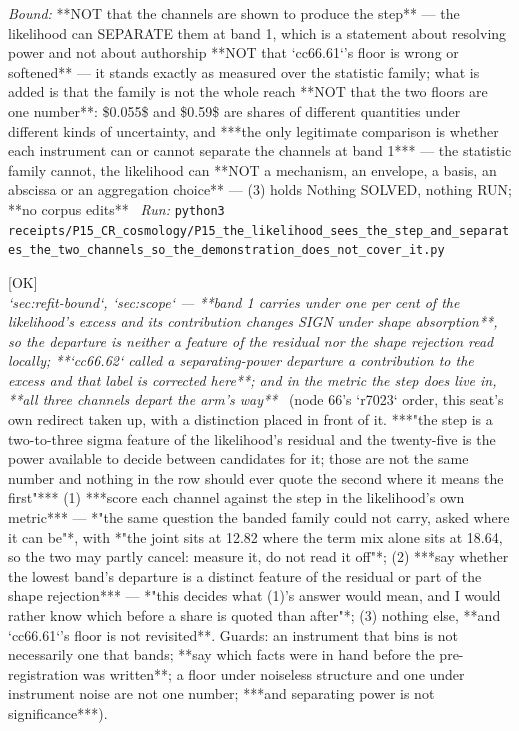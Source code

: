 \begin{description}
 \emph{Bound:}  **NOT that the channels are shown to produce the step** --- the likelihood can SEPARATE them at band 1, which is a statement about resolving power and not about authorship  **NOT that `cc66.61`'s floor is wrong or softened** --- it stands exactly as measured over the statistic family; what is added is that the family is not the whole reach  **NOT that the two floors are one number**: \$0.055\$ and \$0.59\$ are shares of different quantities under different kinds of uncertainty, and ***the only legitimate comparison is whether each instrument can or cannot separate the channels at band 1*** --- the statistic family cannot, the likelihood can  **NOT a mechanism, an envelope, a basis, an abscissa or an aggregation choice** --- (3) holds  Nothing SOLVED, nothing RUN; **no corpus edits**
\ \emph{Run:} \texttt{python3 receipts/P15\_CR\_cosmology/P15\_the\_likelihood\_sees\_the\_step\_and\_separates\_the\_two\_channels\_so\_the\_demonstration\_does\_not\_cover\_it.py}
\item[\rcptlabel{P15_the_band_one_departure_is_not_in_the_likelihoods_excess_and_all_three_channels_match_it_in_separating_power}{P15R210}\textbf{P15R210}\quad\texttt{P15\_the\_band\_one\_departure\_is\_not\_in\_the\_likelihoods\_excess\_and\_all\_three\_channels\_match\_it\_in\_separating\_power}]\hfill\textsf{[OK]}\\
\textit{`sec:refit-bound`, `sec:scope` --- **band 1 carries under one per cent of the likelihood's excess and its contribution changes SIGN under shape absorption**, so the departure is neither a feature of the residual nor the shape rejection read locally; **`cc66.62` called a separating-power departure a contribution to the excess and that label is corrected here**; and in the metric the step does live in, **all three channels depart the arm's way**} \ (node 66's `r7023` order, this seat's own redirect taken up, with a distinction placed in front of it.  ***"the step is a two-to-three sigma feature of the likelihood's residual and the twenty-five is the power available to decide between candidates for it; those are not the same number and nothing in the row should ever quote the second where it means the first"***  (1) ***score each channel against the step in the likelihood's own metric*** --- *"the same question the banded family could not carry, asked where it can be"*, with *"the joint sits at 12.82 where the term mix alone sits at 18.64, so the two may partly cancel: measure it, do not read it off"*; (2) ***say whether the lowest band's departure is a distinct feature of the residual or part of the shape rejection*** --- *"this decides what (1)'s answer would mean, and I would rather know which before a share is quoted than after"*; (3) nothing else, **and `cc66.61`'s floor is not revisited**.  Guards: an instrument that bins is not necessarily one that bands; **say which facts were in hand before the pre-registration was written**; a floor under noiseless structure and one under instrument noise are not one number; ***and separating power is not significance***). 

\end{description}
